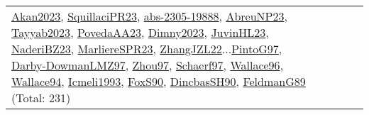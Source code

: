 {\begin{longtable}{p{3cm}r>{\raggedright\arraybackslash}p{6cm}>{\raggedright\arraybackslash}p{6cm}>{\raggedright\arraybackslash}p{8cm}}
\hyperref[detail:Akan2023]{Akan2023}, \hyperref[detail:SquillaciPR23]{SquillaciPR23}, \hyperref[detail:abs-2305-19888]{abs-2305-19888}, \hyperref[detail:AbreuNP23]{AbreuNP23}, \hyperref[detail:Tayyab2023]{Tayyab2023}, \hyperref[detail:PovedaAA23]{PovedaAA23}, \hyperref[detail:Dimny2023]{Dimny2023}, \hyperref[detail:JuvinHL23]{JuvinHL23}, \hyperref[detail:NaderiBZ23]{NaderiBZ23}, \hyperref[detail:MarliereSPR23]{MarliereSPR23}, \hyperref[detail:ZhangJZL22]{ZhangJZL22}...\hyperref[detail:PintoG97]{PintoG97}, \hyperref[detail:Darby-DowmanLMZ97]{Darby-DowmanLMZ97}, \hyperref[detail:Zhou97]{Zhou97}, \hyperref[detail:Schaerf97]{Schaerf97}, \hyperref[detail:Wallace96]{Wallace96}, \hyperref[detail:Wallace94]{Wallace94}, \hyperref[detail:Icmeli1993]{Icmeli1993}, \hyperref[detail:FoxS90]{FoxS90}, \hyperref[detail:DincbasSH90]{DincbasSH90}, \hyperref[detail:FeldmanG89]{FeldmanG89} (Total: 231)\\

\end{longtable}}
